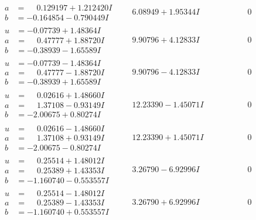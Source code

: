 \documentclass[1p]{elsarticle_modified}
\theoremstyle{definition}
\begin{document}
$$\begin{array}{c|c|c}
\begin{aligned}
a &= \phantom{-}0.129197 + 1.212420 I \\
b &= -0.164854 - 0.790449 I\end{aligned}
 & \phantom{-}6.08949 + 1.95344 I & \phantom{-0.000000 } 0 \\ \hline\begin{aligned}
u &= -0.07739 + 1.48364 I \\
a &= \phantom{-}0.47777 + 1.88720 I \\
b &= -0.38939 - 1.65589 I\end{aligned}
 & \phantom{-}9.90796 + 4.12833 I & \phantom{-0.000000 } 0 \\ \hline\begin{aligned}
u &= -0.07739 - 1.48364 I \\
a &= \phantom{-}0.47777 - 1.88720 I \\
b &= -0.38939 + 1.65589 I\end{aligned}
 & \phantom{-}9.90796 - 4.12833 I & \phantom{-0.000000 } 0 \\ \hline\begin{aligned}
u &= \phantom{-}0.02616 + 1.48660 I \\
a &= \phantom{-}1.37108 - 0.93149 I \\
b &= -2.00675 + 0.80274 I\end{aligned}
 & \phantom{-}12.23390 - 1.45071 I & \phantom{-0.000000 } 0 \\ \hline\begin{aligned}
u &= \phantom{-}0.02616 - 1.48660 I \\
a &= \phantom{-}1.37108 + 0.93149 I \\
b &= -2.00675 - 0.80274 I\end{aligned}
 & \phantom{-}12.23390 + 1.45071 I & \phantom{-0.000000 } 0 \\ \hline\begin{aligned}
u &= \phantom{-}0.25514 + 1.48012 I \\
a &= \phantom{-}0.25389 + 1.43353 I \\
b &= -1.160740 - 0.553557 I\end{aligned}
 & \phantom{-}3.26790 - 6.92996 I & \phantom{-0.000000 } 0 \\ \hline\begin{aligned}
u &= \phantom{-}0.25514 - 1.48012 I \\
a &= \phantom{-}0.25389 - 1.43353 I \\
b &= -1.160740 + 0.553557 I\end{aligned}
 & \phantom{-}3.26790 + 6.92996 I & \phantom{-0.000000 } 0\\

\end{array}$$
\end{document}
